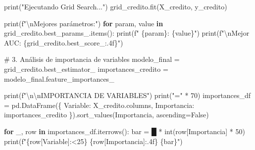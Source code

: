 \documentclass[
  doc,
  floatsintext,
  longtable,
  a4paper,
  nolmodern,
  notxfonts,
  notimes,
  12pt,
  colorlinks=true,linkcolor=blue,citecolor=blue,urlcolor=blue]{apa7}
\newenvironment{Shaded}{\begin{snugshade}}{\end{snugshade}}
\newcommand{\BuiltInTok}[1]{\textcolor[rgb]{0.00,0.23,0.31}{#1}}
\newcommand{\CharTok}[1]{\textcolor[rgb]{0.13,0.47,0.30}{#1}}
\newcommand{\CommentTok}[1]{\textcolor[rgb]{0.37,0.37,0.37}{#1}}
\newcommand{\ControlFlowTok}[1]{\textcolor[rgb]{0.00,0.23,0.31}{\textbf{#1}}}
\newcommand{\DecValTok}[1]{\textcolor[rgb]{0.68,0.00,0.00}{#1}}
\newcommand{\KeywordTok}[1]{\textcolor[rgb]{0.00,0.23,0.31}{\textbf{#1}}}
\newcommand{\NormalTok}[1]{\textcolor[rgb]{0.00,0.23,0.31}{#1}}
\newcommand{\OperatorTok}[1]{\textcolor[rgb]{0.37,0.37,0.37}{#1}}
\newcommand{\SpecialCharTok}[1]{\textcolor[rgb]{0.37,0.37,0.37}{#1}}
\newcommand{\SpecialStringTok}[1]{\textcolor[rgb]{0.13,0.47,0.30}{#1}}
\newcommand{\StringTok}[1]{\textcolor[rgb]{0.13,0.47,0.30}{#1}}
\newcommand{\VariableTok}[1]{\textcolor[rgb]{0.07,0.07,0.07}{#1}}
\begin{document}
\begin{Shaded}
\begin{Highlighting}[]
\BuiltInTok{print}\NormalTok{(}\StringTok{"Ejecutando Grid Search..."}\NormalTok{)}
\NormalTok{grid\_credito.fit(X\_credito, y\_credito)}

\BuiltInTok{print}\NormalTok{(}\SpecialStringTok{f"}\CharTok{\textbackslash{}n}\SpecialStringTok{Mejores parámetros:"}\NormalTok{)}
\ControlFlowTok{for}\NormalTok{ param, value }\KeywordTok{in}\NormalTok{ grid\_credito.best\_params\_.items():}
    \BuiltInTok{print}\NormalTok{(}\SpecialStringTok{f"  }\SpecialCharTok{\{}\NormalTok{param}\SpecialCharTok{\}}\SpecialStringTok{: }\SpecialCharTok{\{}\NormalTok{value}\SpecialCharTok{\}}\SpecialStringTok{"}\NormalTok{)}
\BuiltInTok{print}\NormalTok{(}\SpecialStringTok{f"}\CharTok{\textbackslash{}n}\SpecialStringTok{Mejor AUC: }\SpecialCharTok{\{}\NormalTok{grid\_credito}\SpecialCharTok{.}\NormalTok{best\_score\_}\SpecialCharTok{:.4f\}}\SpecialStringTok{"}\NormalTok{)}

\CommentTok{\# 3. Análisis de importancia de variables}
\NormalTok{modelo\_final }\OperatorTok{=}\NormalTok{ grid\_credito.best\_estimator\_}
\NormalTok{importances\_credito }\OperatorTok{=}\NormalTok{ modelo\_final.feature\_importances\_}

\BuiltInTok{print}\NormalTok{(}\SpecialStringTok{f"}\CharTok{\textbackslash{}n\textbackslash{}n}\SpecialStringTok{IMPORTANCIA DE VARIABLES"}\NormalTok{)}
\BuiltInTok{print}\NormalTok{(}\StringTok{"="} \OperatorTok{*} \DecValTok{70}\NormalTok{)}
\NormalTok{importances\_df }\OperatorTok{=}\NormalTok{ pd.DataFrame(\{}
    \StringTok{\textquotesingle{}Variable\textquotesingle{}}\NormalTok{: X\_credito.columns,}
    \StringTok{\textquotesingle{}Importancia\textquotesingle{}}\NormalTok{: importances\_credito}
\NormalTok{\}).sort\_values(}\StringTok{\textquotesingle{}Importancia\textquotesingle{}}\NormalTok{, ascending}\OperatorTok{=}\VariableTok{False}\NormalTok{)}

\ControlFlowTok{for}\NormalTok{ \_, row }\KeywordTok{in}\NormalTok{ importances\_df.iterrows():}
\NormalTok{    bar }\OperatorTok{=} \StringTok{\textquotesingle{}█\textquotesingle{}} \OperatorTok{*} \BuiltInTok{int}\NormalTok{(row[}\StringTok{\textquotesingle{}Importancia\textquotesingle{}}\NormalTok{] }\OperatorTok{*} \DecValTok{50}\NormalTok{)}
    \BuiltInTok{print}\NormalTok{(}\SpecialStringTok{f"}\SpecialCharTok{\{}\NormalTok{row[}\StringTok{\textquotesingle{}Variable\textquotesingle{}}\NormalTok{]}\SpecialCharTok{:\textless{}25\}}\SpecialStringTok{ }\SpecialCharTok{\{}\NormalTok{row[}\StringTok{\textquotesingle{}Importancia\textquotesingle{}}\NormalTok{]}\SpecialCharTok{:.4f\}}\SpecialStringTok{ }\SpecialCharTok{\{}\NormalTok{bar}\SpecialCharTok{\}}\SpecialStringTok{"}\NormalTok{)}


\end{Highlighting}
\end{Shaded}
\end{document}
